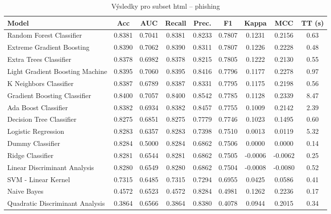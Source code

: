 \begin{table}[H]
  \centering
  \small
  \caption{Výsledky pro subset html – phishing}
  \begin{tabular}{|l|c|c|c|c|c|c|c|c|}
    \hline
    \textbf{Model} & \textbf{Acc} & \textbf{AUC} & \textbf{Recall} & \textbf{Prec.} & \textbf{F1} & \textbf{Kappa} & \textbf{MCC} & \textbf{TT (s)} \\
    \hline
    Random Forest Classifier & 0.8381 & 0.7041 & 0.8381 & 0.8233 & 0.7807 & 0.1231 & 0.2156 & 0.63 \\
    Extreme Gradient Boosting & 0.8390 & 0.7062 & 0.8390 & 0.8311 & 0.7807 & 0.1226 & 0.2228 & 0.48 \\
    Extra Trees Classifier & 0.8378 & 0.6982 & 0.8378 & 0.8215 & 0.7805 & 0.1222 & 0.2130 & 0.55 \\
    Light Gradient Boosting Machine & 0.8395 & 0.7060 & 0.8395 & 0.8416 & 0.7796 & 0.1177 & 0.2278 & 0.97 \\
    K Neighbors Classifier & 0.8387 & 0.6789 & 0.8387 & 0.8331 & 0.7795 & 0.1175 & 0.2198 & 0.56 \\
    Gradient Boosting Classifier & 0.8400 & 0.7057 & 0.8400 & 0.8542 & 0.7785 & 0.1128 & 0.2339 & 8.47 \\
    Ada Boost Classifier & 0.8382 & 0.6934 & 0.8382 & 0.8457 & 0.7755 & 0.1009 & 0.2142 & 2.39 \\
    Decision Tree Classifier & 0.8275 & 0.6851 & 0.8275 & 0.7779 & 0.7746 & 0.1023 & 0.1495 & 0.60 \\
    Logistic Regression & 0.8283 & 0.6357 & 0.8283 & 0.7398 & 0.7510 & 0.0013 & 0.0119 & 5.32 \\
    Dummy Classifier & 0.8284 & 0.5000 & 0.8284 & 0.6862 & 0.7506 & 0.0000 & 0.0000 & 0.14 \\
    Ridge Classifier & 0.8281 & 0.6544 & 0.8281 & 0.6862 & 0.7505 & -0.0006 & -0.0062 & 0.25 \\
    Linear Discriminant Analysis & 0.8280 & 0.6549 & 0.8280 & 0.6862 & 0.7504 & -0.0008 & -0.0080 & 0.52 \\
    SVM - Linear Kernel & 0.7315 & 0.6485 & 0.7315 & 0.7294 & 0.6955 & 0.0425 & 0.0586 & 0.41 \\
    Naive Bayes & 0.4572 & 0.6523 & 0.4572 & 0.8284 & 0.4981 & 0.1262 & 0.2236 & 0.17 \\
    Quadratic Discriminant Analysis & 0.3864 & 0.6566 & 0.3864 & 0.8380 & 0.4078 & 0.0944 & 0.2015 & 0.34 \\
    \hline
  \end{tabular}
\end{table}
\vspace{0.5cm}

